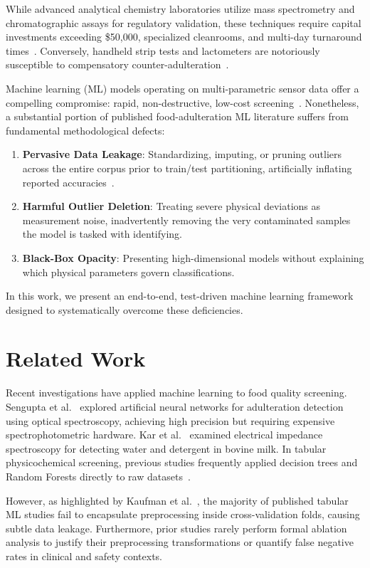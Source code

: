 \documentclass[conference]{IEEEtran}
\begin{document}
While advanced analytical chemistry laboratories utilize mass spectrometry and chromatographic assays for regulatory validation, these techniques require capital investments exceeding \$50,000, specialized cleanrooms, and multi-day turnaround times~\cite{poonia2017}. Conversely, handheld strip tests and lactometers are notoriously susceptible to compensatory counter-adulteration~\cite{sharma2020}.

Machine learning (ML) models operating on multi-parametric sensor data offer a compelling compromise: rapid, non-destructive, low-cost screening~\cite{saadatmand2022}. Nonetheless, a substantial portion of published food-adulteration ML literature suffers from fundamental methodological defects:
\begin{enumerate}
    \item \textbf{Pervasive Data Leakage}: Standardizing, imputing, or pruning outliers across the entire corpus prior to train/test partitioning, artificially inflating reported accuracies~\cite{kaufman2012}.
    \item \textbf{Harmful Outlier Deletion}: Treating severe physical deviations as measurement noise, inadvertently removing the very contaminated samples the model is tasked with identifying.
    \item \textbf{Black-Box Opacity}: Presenting high-dimensional models without explaining which physical parameters govern classifications.
\end{enumerate}

In this work, we present an end-to-end, test-driven machine learning framework designed to systematically overcome these deficiencies.

\section{Related Work}
Recent investigations have applied machine learning to food quality screening. Sengupta et al.~\cite{sengupta2016} explored artificial neural networks for adulteration detection using optical spectroscopy, achieving high precision but requiring expensive spectrophotometric hardware. Kar et al.~\cite{kar2018} examined electrical impedance spectroscopy for detecting water and detergent in bovine milk. In tabular physicochemical screening, previous studies frequently applied decision trees and Random Forests directly to raw datasets~\cite{kumar2021}. 

However, as highlighted by Kaufman et al.~\cite{kaufman2012}, the majority of published tabular ML studies fail to encapsulate preprocessing inside cross-validation folds, causing subtle data leakage. Furthermore, prior studies rarely perform formal ablation analysis to justify their preprocessing transformations or quantify false negative rates in clinical and safety contexts.
\end{document}
